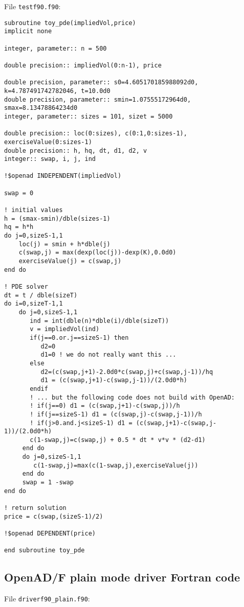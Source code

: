 \documentclass{amsart}
\theoremstyle{plain}
\numberwithin{equation}{section}
\begin{document}
\begin{appendix}
File \verb+testf90.f90+:

\begin{verbatim}
subroutine toy_pde(impliedVol,price)
implicit none

integer, parameter:: n = 500

double precision:: impliedVol(0:n-1), price

double precision, parameter:: s0=4.605170185988092d0, k=4.787491742782046, t=10.0d0
double precision, parameter:: smin=1.07555172964d0, smax=8.13478864234d0
integer, parameter:: sizes = 101, sizet = 5000

double precision:: loc(0:sizes), c(0:1,0:sizes-1), exerciseValue(0:sizes-1)
double precision:: h, hq, dt, d1, d2, v
integer:: swap, i, j, ind

!$openad INDEPENDENT(impliedVol)

swap = 0

! initial values
h = (smax-smin)/dble(sizes-1)
hq = h*h
do j=0,sizeS-1,1
    loc(j) = smin + h*dble(j)
    c(swap,j) = max(dexp(loc(j))-dexp(K),0.0d0)
    exerciseValue(j) = c(swap,j)
end do

! PDE solver
dt = t / dble(sizeT)
do i=0,sizeT-1,1
    do j=0,sizeS-1,1
       ind = int(dble(n)*dble(i)/dble(sizeT))
       v = impliedVol(ind)
       if(j==0.or.j==sizeS-1) then
          d2=0
          d1=0 ! we do not really want this ...
       else
          d2=(c(swap,j+1)-2.0d0*c(swap,j)+c(swap,j-1))/hq
          d1 = (c(swap,j+1)-c(swap,j-1))/(2.0d0*h)
       endif
       ! ... but the following code does not build with OpenAD:
       ! if(j==0) d1 = (c(swap,j+1)-c(swap,j))/h
       ! if(j==sizeS-1) d1 = (c(swap,j)-c(swap,j-1))/h
       ! if(j>0.and.j<sizeS-1) d1 = (c(swap,j+1)-c(swap,j-1))/(2.0d0*h)
       c(1-swap,j)=c(swap,j) + 0.5 * dt * v*v * (d2-d1)
     end do
     do j=0,sizeS-1,1
        c(1-swap,j)=max(c(1-swap,j),exerciseValue(j))
     end do
     swap = 1 -swap
end do
  
! return solution
price = c(swap,(sizeS-1)/2)

!$openad DEPENDENT(price)

end subroutine toy_pde
\end{verbatim}

\subsection{OpenAD/F plain mode driver Fortran code}

File \verb+driverf90_plain.f90+:


\end{appendix}
\end{document}
